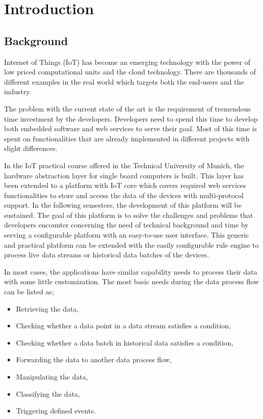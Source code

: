 
\chapter{Introduction}\label{chapter:introduction}

\section{Background}
\label{background}
Internet of Things (IoT) has become an emerging technology with the power of low priced computational units and the cloud technology. There are thousands of different examples in the real world which targets both the end-users and the industry. 

The problem with the current state of the art is the requirement of tremendous time investment by the developers. Developers need to spend this time to develop both embedded software and web services to serve their goal. Most of this time is spent on functionalities that are already implemented in different projects with slight differences.

In the IoT practical course offered in the Technical University of Munich, the hardware abstraction layer for single board computers is built. This layer has been extended to a platform with IoT core which covers required web services functionalities to store and access the data of the devices with multi-protocol support. In the following semesters, the development of this platform will be sustained. The goal of this platform is to solve the challenges and problems that developers encounter concerning the need of technical background and time by serving a configurable platform with an easy-to-use user interface. This generic and practical platform can be extended with the easily configurable rule engine to process live data streams or historical data batches of the devices.

In most cases, the applications have similar capability needs to process their data with some little customization. The most basic needs during the data process flow can be listed as;
\begin{itemize}
  \item Retrieving the data,
  \item Checking whether a data point in a data stream satisfies a condition,
  \item Checking whether a data batch in historical data satisfies a condition,
  \item Forwarding the data to another data process flow,
  \item Manipulating the data,
  \item Classifying the data,
  \item Triggering defined events.
\end{itemize}

